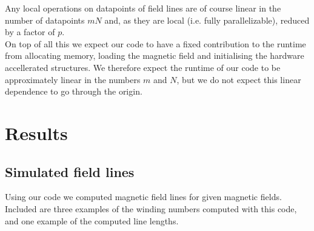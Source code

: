 \documentclass[a4paper]{article}
\begin{document}
Any local operations on datapoints of field lines are of course linear in the number of datapoints $mN$ and, as they are local (i.e. fully parallelizable), reduced by a factor of $p$.\\
On top of all this we expect our code to have a fixed contribution to the runtime from allocating memory, loading the magnetic field and initialising the hardware accellerated structures. We therefore expect the runtime of our code to be approximately linear in the numbers $m$ and $N$, but we do not expect this linear dependence to go through the origin.

\section{Results}
\subsection{Simulated field lines}
Using our code we computed magnetic field lines for given magnetic fields. Included are three examples of the winding numbers computed with this code, and one example of the computed line lengths.
\end{document}

